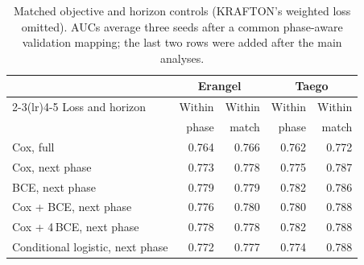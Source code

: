 \begin{table}[t]
\centering\footnotesize
\caption{Matched objective and horizon controls (KRAFTON's weighted loss omitted). AUCs average three seeds after a common phase-aware validation mapping; the last two rows were added after the main analyses.}
\label{tab:objective}
\setlength{\tabcolsep}{3pt}
\begin{tabular}{lrrrr}
\toprule
 & \multicolumn{2}{c}{Erangel} & \multicolumn{2}{c}{Taego} \\
\cmidrule(lr){2-3}\cmidrule(lr){4-5}
Loss and horizon & Within & Within & Within & Within \\
 & phase & match & phase & match \\
\midrule
Cox, full & 0.764 & 0.766 & 0.762 & 0.772 \\
Cox, next phase & 0.773 & 0.778 & 0.775 & 0.787 \\
BCE, next phase & 0.779 & 0.779 & 0.782 & 0.786 \\
Cox + BCE, next phase & 0.776 & 0.780 & 0.780 & 0.788 \\
Cox + 4\,BCE, next phase & 0.778 & 0.778 & 0.782 & 0.788 \\
Conditional logistic, next phase & 0.772 & 0.777 & 0.774 & 0.788 \\
\bottomrule
\end{tabular}
\end{table}
